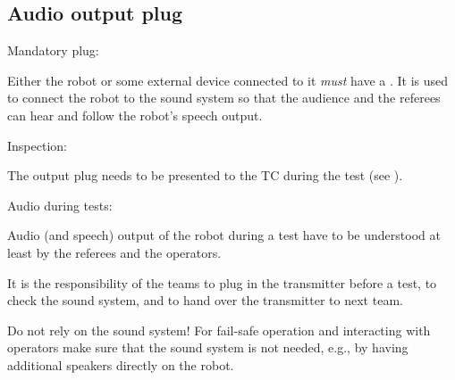 \subsection{Audio output plug}\label{rule:roobt_audio_out}

\begin{enumerate}
	{\bf\item Mandatory plug:} Either the robot or some external device connected to it \emph{must} have a . It is used to connect the robot to the sound system so that the audience and the referees can hear and follow the robot's speech output.
	{\bf\item Inspection:} The output plug needs to be presented to the TC during the  test (see ).
	{\bf\item Audio during tests:} Audio (and speech) output of the robot during a test have to be understood at least by the referees and the operators.
	\begin{compactitem}
		\item It is the responsibility of the teams to plug in the transmitter before a test, to check the sound system, and to hand over the transmitter to next team.
		\item Do not rely on the sound system! For fail-safe operation and interacting with operators make sure that the sound system is not needed, e.g., by having additional speakers directly on the robot.
\end{compactitem}
\end{enumerate}

